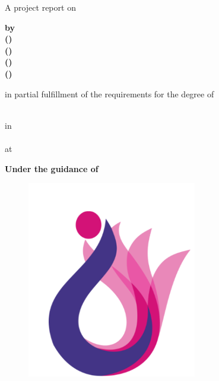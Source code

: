 
\thispagestyle{empty}

\begin{center}

{\large {A project report on}}
\vspace{0.6cm}

{\Huge \textbf{\reportTitle}}
\vspace{0.4cm}

{\large\textbf{by}}\\
{\large \bf \studentNameone} 
{\bf (\enrollmentNumberone)}\\
{\large \bf \studentNametwo} 
{\bf (\enrollmentNumbertwo)}\\
{\large \bf \studentNamethree} 
{\bf (\enrollmentNumberthree)}\\
{\large \bf \studentNamefour} 
{\bf (\enrollmentNumberfour)}\\
\vspace{0.9cm}

in partial fulfillment of the requirements for the degree of
\vspace{0.6cm}


{\large\textbf{\degreeName}}\\
{\large{in}}\\
{\large\textbf{\branchName}}\\
\vspace{0.5cm}
{\large{at}}\\
{\Large \textbf{\universityName}}
\vspace{0.6cm}

{\large\textbf{Under the guidance of}}\\
{\large \bf \guideName}
\vspace{0.1cm}

\begin{figure}[h]
\begin{center}
 \includegraphics[scale=0.8]{UTU.png}
\end{center}
\end{figure}
{\bf \departmentName}\\
{\bf \instituteName}\\
{\bf \locationName}\\
{\bf \academicYear}
\end{center}


